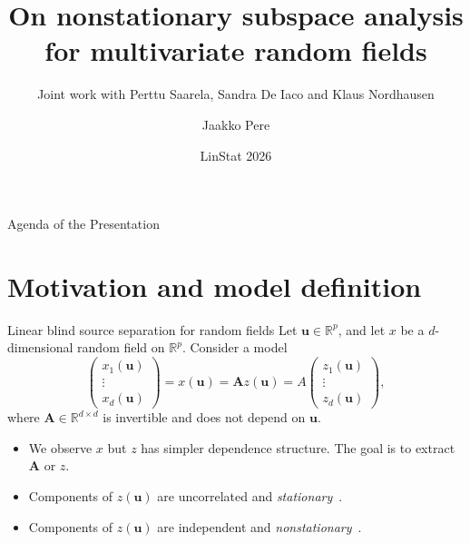 \documentclass{beamer}
\title{On nonstationary subspace analysis for multivariate random fields}
\subtitle{Joint work with Perttu Saarela, Sandra De Iaco and Klaus Nordhausen}
\author{Jaakko Pere}
\date{LinStat 2026}
\begin{document}
\frame{\titlepage}

\begin{frame}{Agenda of the Presentation}
\tableofcontents
\end{frame}


\section{Motivation and model definition}


\begin{frame}{Linear blind source separation for random fields}
  Let $\bm u\in\mathbb{R}^p$, and let $x$ be a $d$-dimensional random field on
  $\mathbb{R}^p$. Consider a model
  \begin{equation*}
    \begin{pmatrix}
      x_1(\bm u) \\ \vdots \\ x_d(\bm u)
    \end{pmatrix} =
    x(\bm u) = \bm A z(\bm u) = A
    \begin{pmatrix}
      z_1(\bm u) \\ \vdots \\ z_d(\bm u)
    \end{pmatrix},
  \end{equation*}
  where $\bm A\in\mathbb{R}^{d\times d}$ is invertible and does not depend on
  $\bm u$.
  \pause
  \begin{itemize}
    \item[$\Rightarrow$] We observe $x$ but $z$ has simpler dependence
    structure. The goal is to extract $\bm A$ or $z$.
    \pause
    \item Components of $z(\bm u)$ are uncorrelated and
    \emph{stationary}~\parencite{bachoc2020}.
    \item Components of $z(\bm u)$ are independent and
    \emph{nonstationary}~\parencite{bachoc2024}.
  \end{itemize}
\end{frame}

\end{document}
